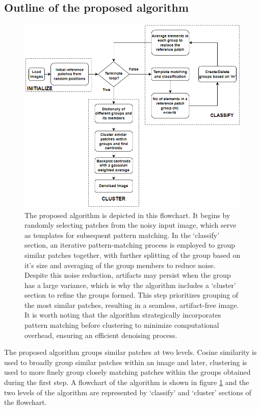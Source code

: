 \documentclass[fleqn,10pt]{wlscirep}
\begin{document}
	\subsection*{Outline of the proposed algorithm}
	
	\begin{figure}[H]
		\centering
		\includegraphics[scale=0.72]{./imgs/flowchart.png}
		\caption{ The proposed algorithm is depicted in this flowchart. It begins by randomly selecting patches from the noisy input image, which serve as templates for subsequent pattern matching. In the `classify' section, an iterative pattern-matching process is employed to group similar patches together, with further splitting of the group based on it's size and averaging of the group members to reduce noise. Despite this noise reduction, artifacts may persist when the group has a large variance, which is why the algorithm includes a `cluster' section to refine the groups formed. This step prioritizes grouping of the most similar patches, resulting in a seamless, artifact-free image. It is worth noting that the algorithm strategically incorporates pattern matching before clustering to minimize computational overhead, ensuring an efficient denoising process.}
		\label{fig:flowchart}
	\end{figure} 
	
	The proposed algorithm groups similar patches at two levels. Cosine similarity is used to broadly group similar patches within an image and later, clustering is used to more finely group closely matching patches within the groups obtained during the first step. A flowchart of the algorithm is shown in figure \ref{fig:flowchart} and the two levels of the algorithm are represented by `classify' and `cluster' sections of the flowchart.
	
\end{document}
